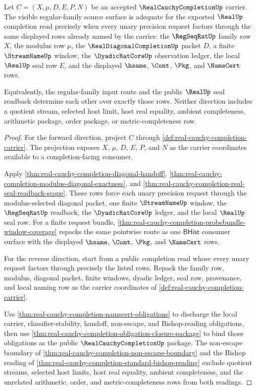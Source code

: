 \begin{theorem}
\label{thm:real-cauchy-completion-regular-family-source-adequacy}
Let $C=(X,\mu,D,E,P,N)$ be an accepted $\RealCauchyCompletionUp$ carrier. The visible regular-family source surface is adequate for the exported $\RealUp$ completion read precisely when every unary precision request factors through the same displayed rows already named by the carrier: the $\RegSeqRatUp$ family row $X$, the modulus row $\mu$, the $\RealDiagonalCompletionUp$ packet $D$, a finite $\StreamNameUp$ window, the $\DyadicRatCoreUp$ observation ledger, the local $\RealUp$ seal row $E$, and the displayed $\hsame$, $\Cont$, $\Pkg$, and $\NameCert$ rows.

Equivalently, the regular-family input route and the public $\RealUp$ seal readback determine each other over exactly those rows. Neither direction includes a quotient stream, selected host limit, host real equality, ambient completeness, arithmetic package, order package, or metric-completeness row.
\end{theorem}
\begin{proof}
For the forward direction, project $C$ through \autoref{def:real-cauchy-completion-carrier}. The projection exposes $X$, $\mu$, $D$, $E$, $P$, and $N$ as the carrier coordinates available to a completion-facing consumer.

Apply \autoref{thm:real-cauchy-completion-diagonal-handoff}, \autoref{thm:real-cauchy-completion-modulus-diagonal-exactness}, and \autoref{thm:real-cauchy-completion-real-seal-readback-scope}. These rows force each unary precision request through the modulus-selected diagonal packet, one finite $\StreamNameUp$ window, the $\RegSeqRatUp$ readback, the $\DyadicRatCoreUp$ ledger, and the local $\RealUp$ seal row. For a finite request bundle, \autoref{thm:real-cauchy-completion-probebundle-window-coverage} repacks the same pointwise route as one $\mathsf{BHist}$ consumer surface with the displayed $\hsame$, $\Cont$, $\Pkg$, and $\NameCert$ rows.

For the reverse direction, start from a public completion read whose every unary request factors through precisely the listed rows. Repack the family row, modulus, diagonal packet, finite windows, dyadic ledger, seal row, provenance, and local naming row as the carrier coordinates of \autoref{def:real-cauchy-completion-carrier}.

Use \autoref{thm:real-cauchy-completion-namecert-obligations} to discharge the local carrier, classifier-stability, handoff, non-escape, and Bishop-reading obligations, then use \autoref{thm:real-cauchy-completion-obligation-closure-package} to bind those obligations as the public $\RealCauchyCompletionUp$ package. The non-escape boundary of \autoref{thm:real-cauchy-completion-non-escape-boundary} and the Bishop reading of \autoref{thm:real-cauchy-completion-standard-bishop-reading} exclude quotient streams, selected host limits, host real equality, ambient completeness, and the unrelated arithmetic, order, and metric-completeness rows from both readings.
\end{proof}

